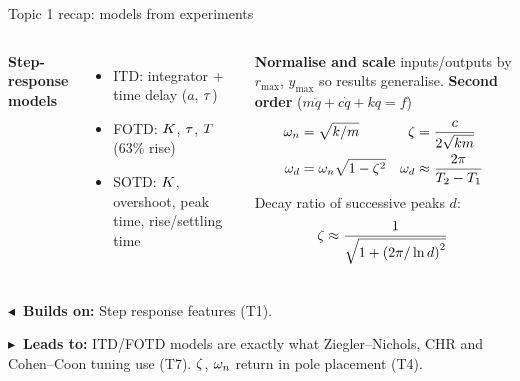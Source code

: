 \documentclass[10pt]{beamer-control}
\newcommand\LINKS[2]{%
  \par\vfill
  {\scriptsize\setlength\fboxsep{3pt}%
  \colorbox{AUHighlight!10}{\parbox{\dimexpr\linewidth-6pt\relax}{%
    \textbf{\color{AUHighlight}$\blacktriangleleft$~Builds on:} #1\par
    \textbf{\color{AUHighlight}$\blacktriangleright$~Leads to:} #2%
    \hfill\hyperlink{coursemap}{\beamerbutton{Course map}}}}}%
}
\begin{document}
\begin{frame}{Topic 1 recap: models from experiments}
  \begin{columns}[t]
    \footnotesize
    \textbf{Step-response models}
    \begin{itemize}
      \item ITD: integrator + time delay ($a$, $\tau$)
      \item FOTD: $K$, $\tau$, $T$ (63\% rise)
      \item SOTD: $K$, overshoot, peak time, rise/settling time
    \end{itemize}
    \textbf{Normalise and scale} inputs/outputs by $r_{\max}$, $y_{\max}$ so results generalise.
    \footnotesize
    \textbf{Second order} ($m\ddot q + c\dot q + kq = f$)
    \begin{align*}
      \omega_n &= \sqrt{k/m} & \zeta &= \frac{c}{2\sqrt{km}}\\
      \omega_d &= \omega_n\sqrt{1-\zeta^2} & \omega_d &\approx \frac{2\pi}{T_2-T_1}
    \end{align*}
    Decay ratio of successive peaks $d$:
    \begin{align*}
      \zeta \approx \frac{1}{\sqrt{1+\left(2\pi/\ln d\right)^2}}
    \end{align*}
  \end{columns}
  \LINKS{Step response features (T1).}{ITD/FOTD models are exactly what Ziegler--Nichols, CHR and Cohen--Coon tuning use (T7). $\zeta$, $\omega_n$ return in pole placement (T4).}
\end{frame}

\end{document}
